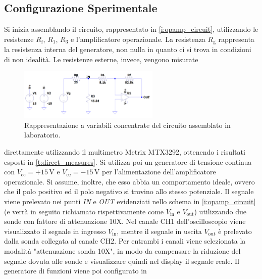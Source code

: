 \documentclass[a4paper,11pt]{article} %
\begin{document}

\subsection{Configurazione Sperimentale}\label{s:guadagno}

Si inizia assemblando il circuito, rappresentato in \autoref{i:opamp_circuit}, utilizzando le resistenze $R_{\text{f}}$, $R_1$,
$R_3$ e l'amplificatore operazionale. La resistenza $R_{\text{g}}$ rappresenta la resistenza interna del generatore, non nulla in
quanto ci si trova in condizioni di non idealità. Le resistenze esterne, invece, vengono misurate

\begin{figure}
	\centering
	\includegraphics[width=0.6\textwidth]{../Simulations/OpAmp/circuit_image_nosim.png}
	\caption{\footnotesize Rappresentazione a variabili concentrate del circuito assemblato in laboratorio.}
	\label{i:opamp_circuit}
\end{figure}

\noindent direttamente utilizzando il multimetro Metrix MTX3292, ottenendo i risultati esposti in
\autoref{t:direct_measures}. Si utilizza poi un generatore di tensione continua con $V_{\text{cc}}=+15\,\si{\volt}$ e
$V_{\text{ee}}=-15\,\si{\volt}$ per l'alimentazione dell'amplificatore operazionale. Si assume, inoltre, che esso abbia
un comportamento ideale, ovvero che il polo positivo ed il polo negativo si trovino allo stesso potenziale. Il segnale
viene prelevato nei punti \textit{IN} e \textit{OUT} evidenziati nello schema in \autoref{i:opamp_circuit} (e verrà in
seguito richiamato rispettivamente come $V_{\text{in}}$ e $V_{\text{out}}$) utilizzando due sonde con fattore di
attenuazione 10X. Nel canale CH1 dell'oscilloscopio viene visualizzato il segnale in ingresso $V_{\text{in}}$, mentre il
segnale in uscita $V_{\text{out}}$ è prelevato dalla sonda collegata al canale CH2. Per entrambi i canali viene
selezionata la modalità "attenuazione sonda 10X", in modo da compensare la riduzione del segnale dovuta alle sonde e
visualizzare quindi nel display il segnale reale. Il generatore di funzioni viene poi configurato in
\end{document}
